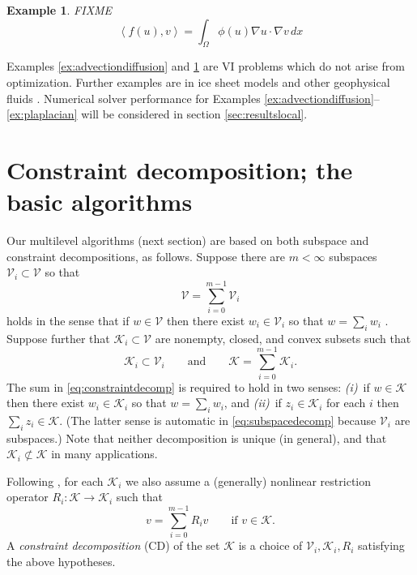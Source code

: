 \documentclass[letterpaper,final,12pt,reqno]{amsart}
\theoremstyle{cstyle}
\theoremstyle{dstyle}
\newtheorem{example}[theorem]{Example}
\numberwithin{equation}{section}
\numberwithin{figure}{section}
\numberwithin{table}{section}
\numberwithin{theorem}{section}
\newcommand{\grad}{\nabla}
\newcommand{\cK}{\mathcal{K}}
\newcommand{\cV}{\mathcal{V}}
\newcommand{\ip}[2]{\left<#1,#2\right>}
\begin{document}
\begin{example}  \label{ex:porousgeneralization}  FIXME
\begin{equation}
\ip{f(u)}{v} = \int_\Omega \phi(u) \grad u \cdot \grad v\,dx \label{eq:porousgeneralization}
\end{equation}
\end{example}

Examples \ref{ex:advectiondiffusion} and \ref{ex:porousgeneralization} are VI problems which do not arise from optimization.  Further examples are in ice sheet models \cite{Calvoetal2002,JouvetBueler2012} and other geophysical fluids \cite{Bueler2021conservation}.  Numerical solver performance for Examples \ref{ex:advectiondiffusion}--\ref{ex:plaplacian} will be considered in section \ref{sec:resultslocal}.  %


\section{Constraint decomposition; the basic algorithms} \label{sec:cd}

Our multilevel algorithms (next section) are based on both subspace and constraint decompositions, as follows.  Suppose there are $m<\infty$ subspaces $\cV_i \subset \cV$ so that
\begin{equation}
\cV = \sum_{i=0}^{m-1} \cV_i \label{eq:subspacedecomp}
\end{equation}
holds in the sense that if $w \in \cV$ then there exist $w_i \in \cV_i$ so that $w = \sum_i w_i$ \cite{Xu1992}.  Suppose further that $\cK_i \subset \cV$ are nonempty, closed, and convex subsets such that
\begin{equation}
\cK_i \subset \cV_i \qquad \text{and} \qquad \cK = \sum_{i=0}^{m-1} \cK_i. \label{eq:constraintdecomp}
\end{equation}
The sum in \eqref{eq:constraintdecomp} is required to hold in two senses: \emph{(i)}~if $w \in \cK$ then there exist $w_i \in \cK_i$ so that $w = \sum_i w_i$, and \emph{(ii)}~if $z_i \in \cK_i$ for each $i$ then $\sum_i z_i \in \cK$.  (The latter sense is automatic in \eqref{eq:subspacedecomp} because $\cV_i$ are subspaces.)  Note that neither decomposition is unique (in general), and that $\cK_i \not\subset \cK$ in many applications.

Following \cite{Tai2003}, for each $\cK_i$ we also assume a (generally) nonlinear restriction operator $R_i : \cK \to \cK_i$ such that %
\begin{equation}
v = \sum_{i=0}^{m-1} R_i v \qquad \text{if } v \in \cK.  \label{eq:constraintrestrictionsum}
\end{equation}
A \emph{constraint decomposition} (CD) of the set $\cK$ is a choice of $\cV_i,\cK_i,R_i$ satisfying the above hypotheses.
\end{document}
